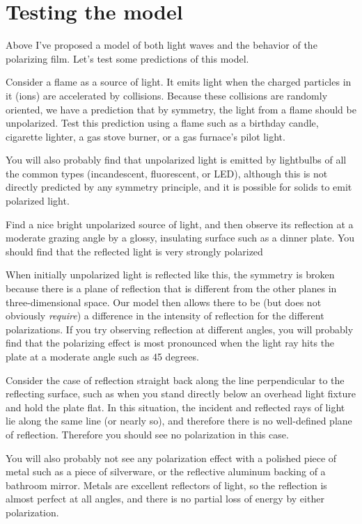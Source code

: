 \section{Testing the model}

Above I've proposed a model of both light waves and the behavior of the polarizing film. Let's
test some predictions of this model.


Consider a flame as a source of light. It emits light when the charged particles in it
(ions) are accelerated by collisions. Because these collisions are randomly oriented,
we have a prediction that by symmetry, the light from a flame should be unpolarized. Test this
prediction using a flame such as a birthday candle, cigarette lighter, a gas stove burner, or
a gas furnace's pilot light.

You will also probably find that unpolarized light is emitted by lightbulbs of all
the common types  (incandescent, fluorescent, or LED), although this is not directly
predicted by any symmetry principle, and it is possible for solids to emit polarized light.


Find a nice bright unpolarized source of light, and then observe its reflection at a moderate grazing
angle by a glossy, insulating surface such as a dinner plate. You should find that the
reflected light is very strongly polarized

When initially unpolarized light is reflected like this,
the symmetry is broken because there is a plane of reflection that is different from the
other planes in three-dimensional space. Our model then allows there to be (but does not
obviously \emph{require}) a difference in the intensity of reflection for the different
polarizations. If you try observing reflection at different angles, you will probably
find that the polarizing effect is most pronounced when the light ray hits the plate at
a moderate angle such as 45 degrees.

Consider the case of reflection straight back along the line perpendicular to the reflecting
surface, such as when you stand directly below an overhead light fixture and hold the plate
flat. In this situation, the incident and reflected rays of light lie along the same
line (or nearly so), and therefore there is no well-defined plane of reflection. Therefore
you should see no polarization in this case.

You will
also probably not see any polarization effect with a polished piece of metal such as
a piece of silverware, or the reflective aluminum backing of a bathroom mirror.
Metals are excellent reflectors of light, so the reflection is almost
perfect at all angles, and there is no partial loss of energy by either polarization.

